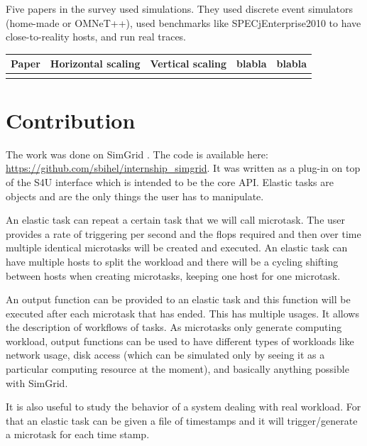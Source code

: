 \documentclass[a4paper]{IEEEtran}
\begin{document}
  Five papers in the survey used simulations. They used discrete event 
  simulators (home-made or OMNeT++), used benchmarks like SPECjEnterprise2010 
  to have close-to-reality hosts, and run real traces.
  
  \begin{center}
  	\begin{tabular}{| l | c | c | c | c |}
  		\hline
  		Paper & Horizontal scaling & Vertical scaling & blabla & blabla \\ 
  		\hline
  		\cite{vasic2012dejavu} & \checkmark & \checkmark & & \\
  		\hline
  	\end{tabular}
  \end{center}


\section{Contribution} \label{contrib}
  The work was done on SimGrid \cite{casanova:hal-01017319}. The code is
  available here: \url{https://github.com/sbihel/internship_simgrid}. It was
  written as a plug-in on top of the S4U interface which is intended to be the
  core API. Elastic tasks are objects and are the only things the user has to
  manipulate.
  
  An elastic task can repeat a certain task that we will call microtask. The 
  user provides a rate of triggering per second and the flops required and then 
  over time multiple identical microtasks will be created and executed. An 
  elastic task can have multiple hosts to split the workload and there will be 
  a cycling shifting between hosts when creating microtasks, keeping one host 
  for one microtask.
  
  An output function can be provided to an elastic task and this function will 
  be executed after each microtask that has ended. This has multiple usages. It 
  allows the description of workflows of tasks. As microtasks only generate 
  computing workload, output functions can be used to have different types of 
  workloads like network usage, disk access (which can be simulated only by 
  seeing it as a particular computing resource at the moment), and basically 
  anything possible with SimGrid.
  
  It is also useful to study the behavior of a system dealing with real 
  workload. For that an elastic task can be given a file of timestamps and it 
  will trigger/generate a microtask for each time stamp.
  
\end{document}
